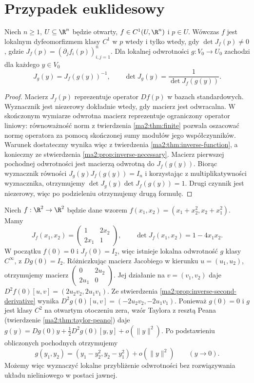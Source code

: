 \section{Przypadek euklidesowy}

\begin{wniosek}
\label{ma2:cor:inverse-jacobian}
Niech $n\ge1$, $U\subseteq\R^n$ będzie otwarty,
$f\in C^1(U,\R^n)$ i $p\in U$. Wówczas $f$ jest
lokalnym dyfeomorfizmem klasy $C^1$ w $p$ wtedy
i tylko wtedy, gdy $\det J_f(p)\ne0$, gdzie
$J_f(p)=(\partial_j f_i(p))_{i,j=1}^n$.
Dla lokalnej odwrotności $g:V_0\to U_0$ zachodzi
dla każdego $y\in V_0$
\[
 J_g(y)=J_f(g(y))^{-1},\qquad
 \det J_g(y)=\frac{1}{\det J_f(g(y))}.
\]
\end{wniosek}
\begin{proof}
Macierz $J_f(p)$ reprezentuje operator $Df(p)$
w bazach standardowych. Wyznacznik jest niezerowy
dokładnie wtedy, gdy macierz jest odwracalna.
W skończonym wymiarze odwrotna macierz reprezentuje
ograniczony operator liniowy: równoważność norm
z twierdzenia \ref{ma2:thm:finite} pozwala oszacować
normę operatora za pomocą skończonej sumy modułów
jego współczynników. Warunek dostateczny
wynika więc z twierdzenia \ref{ma2:thm:inverse-function},
a konieczny ze stwierdzenia
\ref{ma2:prop:inverse-necessary}.
Macierz pierwszej pochodnej odwrotności jest macierzą
odwrotną do $J_f(g(y))$. Biorąc wyznacznik równości
$J_g(y)J_f(g(y))=I_n$ i korzystając z multiplikatywności
wyznacznika, otrzymujemy
$\det J_g(y)\det J_f(g(y))=1$.
Drugi czynnik jest niezerowy, więc po podzieleniu
otrzymujemy drugą formułę.
\end{proof}

\begin{przyklad}
\label{ma2:ex:inverse-polynomial}
Niech $f:\R^2\to\R^2$ będzie dane wzorem
$f(x_1,x_2)=(x_1+x_2^2,x_2+x_1^2)$.
Mamy
\[
 J_f(x_1,x_2)=
 \begin{pmatrix}1&2x_2\\2x_1&1\end{pmatrix},
 \qquad\det J_f(x_1,x_2)=1-4x_1x_2.
\]
W początku $f(0)=0$ i $J_f(0)=I_2$, więc istnieje
lokalna odwrotność $g$ klasy $C^\infty$, z $Dg(0)=I_2$.
Różniczkując macierz Jacobiego w kierunku $u=(u_1,u_2)$,
otrzymujemy macierz $\begin{pmatrix}0&2u_2\\2u_1&0\end{pmatrix}$.
Jej działanie na $v=(v_1,v_2)$ daje
$D^2f(0)[u,v]=(2u_2v_2,2u_1v_1)$.
Ze stwierdzenia \ref{ma2:prop:inverse-second-derivative}
wynika $D^2g(0)[u,v]=(-2u_2v_2,-2u_1v_1)$.
Ponieważ $g(0)=0$ i $g$ jest klasy $C^2$ na otwartym
otoczeniu zera, wzór Taylora z resztą Peana
(twierdzenie \ref{ma2:thm:taylor-peano}) daje
$g(y)=Dg(0)y+\tfrac12 D^2g(0)[y,y]+o(\|y\|^2)$.
Po podstawieniu obliczonych pochodnych otrzymujemy
\[
 g(y_1,y_2)=(y_1-y_2^2,y_2-y_1^2)+o(\|y\|^2)
 \qquad(y\to0).
\]
Możemy więc wyznaczyć lokalne przybliżenie odwrotności
bez rozwiązywania układu nieliniowego w postaci jawnej.
\end{przyklad}

